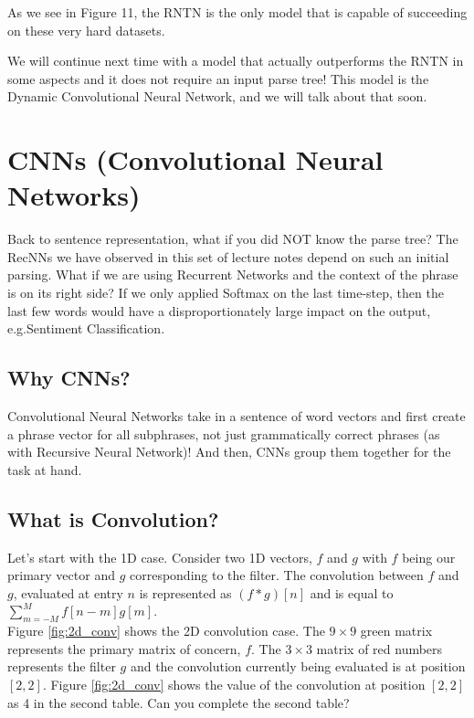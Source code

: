 \documentclass{tufte-handout}
\begin{document}
As we see in Figure 11, the RNTN is the only model that is capable of succeeding on these very hard datasets.

We will continue next time with a model that actually outperforms the RNTN in some aspects and it does not require an input parse tree! This model is the Dynamic Convolutional Neural Network, and we will talk about that soon.

\section{CNNs (Convolutional Neural Networks)}
Back to sentence representation, what if you did NOT know the parse tree? The RecNNs we have observed in this set of lecture notes depend on such an initial parsing. What if we are using Recurrent Networks and the context of the phrase is on its right side? If we only applied Softmax on the last time-step, then the last few words would have a disproportionately large impact on the output, e.g.Sentiment Classification.

\subsection{Why CNNs?}
Convolutional Neural Networks take in a sentence of word vectors and first create a phrase vector for all subphrases, not just grammatically correct phrases (as with Recursive Neural Network)! And then, CNNs group them together for the task at hand.

\subsection{What is Convolution?}
Let's start with the 1D case. Consider two 1D vectors, $f$ and $g$ with $f$ being our primary vector and $g$ corresponding to the filter. The convolution between $f$ and $g$, evaluated at entry $n$ is represented as $(f*g)[n]$ and is equal to $\sum\limits_{m=-M}^Mf[n-m]g[m]$. \\
Figure \ref{fig:2d_conv} shows the 2D convolution case. The $9\times 9$ green matrix represents the primary matrix of concern, $f$. The $3\times 3$ matrix of red numbers represents the filter $g$ and the convolution currently being evaluated is at position $[2,2]$. Figure \ref{fig:2d_conv} shows the value of the convolution at position $[2,2]$ as 4 in the second table. Can you complete the second table?
\end{document}
